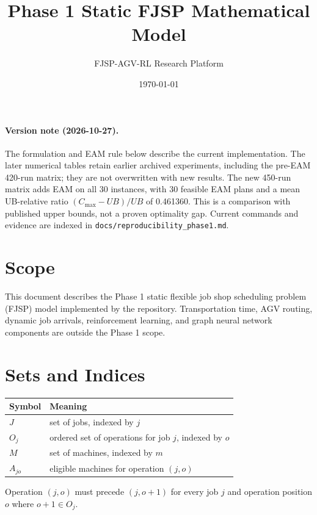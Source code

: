 ﻿\documentclass[11pt]{article}
\title{Phase 1 Static FJSP Mathematical Model}
\author{FJSP-AGV-RL Research Platform}
\date{\today}
\begin{document}
\maketitle

\paragraph{Version note (2026-10-27).}
The formulation and EAM rule below describe the current implementation.
The later numerical tables retain earlier archived experiments, including
the pre-EAM 420-run matrix; they are not overwritten with new results.
The new 450-run matrix adds EAM on all 30 instances, with 30 feasible EAM
plans and a mean UB-relative ratio $(C_{\max}-UB)/UB$ of 0.461360.
This is a comparison with published upper bounds, not a proven optimality gap.
Current commands and evidence are indexed in \texttt{docs/reproducibility\_phase1.md}.

\section{Scope}

This document describes the Phase 1 static flexible job shop scheduling
problem (FJSP) model implemented by the repository. Transportation time,
AGV routing, dynamic job arrivals, reinforcement learning, and graph neural
network components are outside the Phase 1 scope.

\section{Sets and Indices}

\begin{table}[h]
\centering
\begin{tabular}{ll}
\toprule
Symbol & Meaning \\
\midrule
$J$ & set of jobs, indexed by $j$ \\
$O_j$ & ordered set of operations for job $j$, indexed by $o$ \\
$M$ & set of machines, indexed by $m$ \\
$A_{jo}$ & eligible machines for operation $(j,o)$ \\
\bottomrule
\end{tabular}
\end{table}

Operation $(j,o)$ must precede $(j,o+1)$ for every job $j$ and operation
position $o$ where $o+1 \in O_j$.
\end{document}
